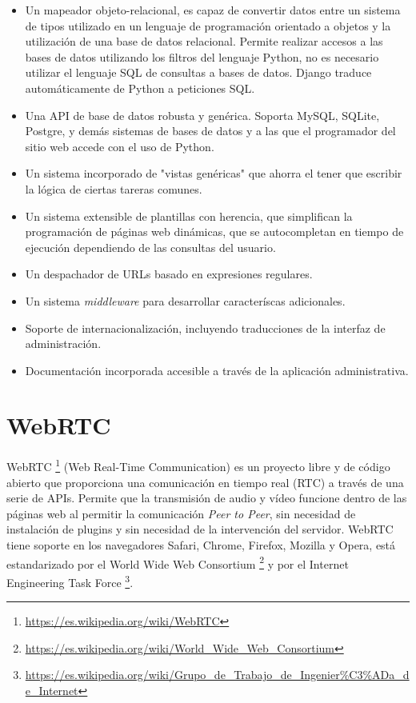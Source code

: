 \documentclass[a4paper, 12pt]{book}
\begin{document}
\begin{itemize}
\item Un mapeador objeto-relacional, es capaz de convertir datos entre un sistema de tipos utilizado en un lenguaje de programación orientado a objetos y la utilización de una base de datos relacional. Permite realizar accesos a las bases de datos utilizando los filtros del lenguaje Python, no es necesario utilizar el lenguaje SQL de consultas a bases de datos. Django traduce automáticamente de Python a peticiones SQL.


\item Una API de base de datos robusta y genérica. Soporta MySQL, SQLite, Postgre, y demás sistemas de bases de datos y a las que el programador del sitio web accede con el uso de Python.

\item Un sistema incorporado de "vistas genéricas" que ahorra el tener que escribir la lógica de ciertas tareras comunes.

\item Un sistema extensible de plantillas con herencia, que simplifican la programación de páginas web dinámicas, que se autocompletan en tiempo de ejecución
dependiendo de las consultas del usuario.

\item Un despachador de URLs basado en expresiones regulares.

\item Un sistema \textit{middleware} para desarrollar caracteríscas adicionales.

\item Soporte de internacionalización, incluyendo traducciones de la interfaz de administración.

\item Documentación incorporada accesible a través de la aplicación administrativa.
\end{itemize}

\section{WebRTC}
\label{sec:webrtc}

WebRTC \footnote{\url{https://es.wikipedia.org/wiki/WebRTC}} \cite{webrtc} (Web Real-Time Communication) es un proyecto libre y de código abierto que proporciona una comunicación en tiempo real (RTC) a través de una serie de APIs. Permite que la transmisión de audio y vídeo funcione dentro de las páginas web al permitir la comunicación \textit{Peer to Peer}, sin necesidad de instalación de plugins y sin necesidad de la intervención del servidor. WebRTC tiene soporte en los navegadores Safari, Chrome, Firefox, Mozilla y Opera, está estandarizado por el World Wide Web Consortium \footnote{\url{https://es.wikipedia.org/wiki/World_Wide_Web_Consortium}} y por el Internet Engineering Task Force \footnote{\url{https://es.wikipedia.org/wiki/Grupo_de_Trabajo_de_Ingenier\%C3\%ADa_de_Internet}}.
\end{document}
